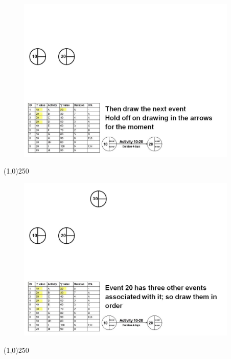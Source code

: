 \begin{frame}
\begin{figure}
	\centering
		\includegraphics[width = 10.5cm]{oldnotes/Slide82.jpg}
\end{figure}
\end{frame}
\begin{center}\line(1,0){250}\end{center}


\begin{frame}
\begin{figure}
	\centering
		\includegraphics[width = 10.5cm]{oldnotes/Slide83.jpg}
\end{figure}
\end{frame}
\begin{center}\line(1,0){250}\end{center}


